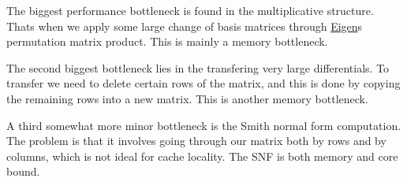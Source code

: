 \begin{DoxyItemize}
\item The biggest performance bottleneck is found in the multiplicative structure. That\textquotesingle{}s when we apply some large change of basis matrices through \hyperlink{namespaceEigen}{Eigen}\textquotesingle{}s permutation matrix product. This is mainly a memory bottleneck.
\item The second biggest bottleneck lies in the transfering very large differentials. To transfer we need to delete certain rows of the matrix, and this is done by copying the remaining rows into a new matrix. This is another memory bottleneck.
\item A third somewhat more minor bottleneck is the Smith normal form computation. The problem is that it involves going through our matrix both by rows and by columns, which is not ideal for cache locality. The S\+NF is both memory and core bound. 
\end{DoxyItemize}